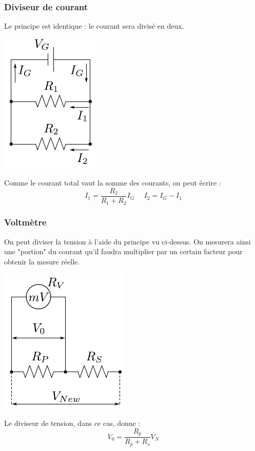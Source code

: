 \documentclass	[11pt, a4paper, openany]{book}
\begin{document}
\subsubsection*{Diviseur de courant}
Le principe est identique : le courant sera divisé en deux.
\begin{center}
\includegraphics[scale=0.5]{labo/image10.png}
\end{center}
Comme le courant total vaut la somme des courants, on peut écrire : 
\begin{equation}
I_1 = \frac{R_2}{R_1 + R_2}I_G\ \ \ \ \ \ I_2 = I_G - I_1
\end{equation}

\subsubsection*{Voltmètre}
On peut diviser la tension à l'aide du principe vu ci-dessus. On mesurera ainsi une "portion" du courant qu'il faudra multiplier par un certain facteur pour obtenir la mesure réelle.
\begin{center}
\includegraphics[scale=0.5]{labo/image11.png}
\end{center}
Le diviseur de tension, dans ce cas, donne :
\begin{equation}
V_0 = \frac{R_p}{R_p + R_s}V_N
\end{equation}
\end{document}
